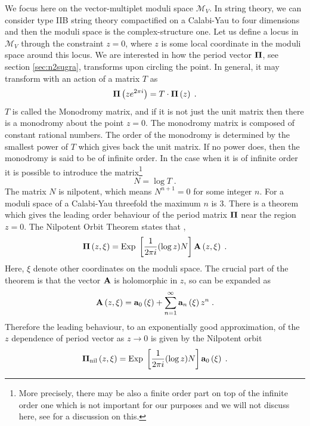 \documentclass[11pt,a4paper]{article}
\numberwithin{equation}{section}
\numberwithin{table}{section}\setlength{\multlinegap}{25pt}
\newcommand{\cM}{\mathcal M}
\newcommand{\be}{\begin{equation}}
\newcommand{\ee}{\end{equation}}
\begin{document}
We focus here on the vector-multiplet moduli space $\cM_V$. In string theory, we can consider type IIB string theory compactified on a Calabi-Yau to four dimensions and then the moduli space is the complex-structure one. Let us define a locus in $\cM_V$ through the constraint $z=0$, where $z$ is some local coordinate in the moduli space around this locus. We are interested in how the period vector ${\bf \Pi}$, see section \ref{sec:n2sugra}, transforms upon circling the point. In general, it may transform with an action of a matrix $T$ as
\be
{\bf \Pi}\left(z e^{2 \pi i}\right) = T \cdot {\bf \Pi}\left(z \right) \;.
\label{monTdef}
\ee
$T$ is called the Monodromy matrix, and if it is not just the unit matrix then there is a monodromy about the point $z=0$. The monodromy matrix is composed of constant rational numbers. The order of the monodromy is determined by the smallest power of $T$ which gives back the unit matrix. If no power does, then the monodromy is said to be of infinite order.  In the case when it is of infinite order it is possible to introduce the matrix\footnote{More precisely, there may be also a finite order part on top of the infinite order one which is not important for our purposes and we will not discuss here, see \cite{Grimm:2018ohb} for a discussion on this.} 
\be
N = \log T \;.
\ee
The matrix $N$ is nilpotent, which means $N^{n+1}=0$ for some integer $n$. For a moduli space of a Calabi-Yau threefold the maximum $n$ is 3. There is a theorem which gives the leading order behaviour of the period matrix ${\bf \Pi}$ near the region $z=0$. The Nilpotent Orbit Theorem states that \cite{Schmid}, 
\be
{\bf \Pi}\left(z,\xi\right) = \mathrm{Exp\;}\left[ \frac{1}{2\pi i} (\log z) N \right] {\bf A}\left(z,\xi \right) \;.
\label{nilorbgen}
\ee
Here, $\xi$ denote other coordinates on the moduli space. The crucial part of the theorem is that the vector ${\bf A}$ is holomorphic in $z$, so can be expanded as
\be
 {\bf A}\left(z,\xi \right) = {\bf a}_0\left(\xi\right) + \sum_{n=1}^{\infty} {\bf a}_n \left( \xi \right) z^n \;.
\ee
Therefore the leading behaviour, to an exponentially good approximation, of the $z$ dependence of period vector as $z \rightarrow 0$ is given by the Nilpotent orbit
\be
{\bf \Pi}_{\mathrm{nil}}\left(z,\xi\right) = \mathrm{Exp\;}\left[ \frac{1}{2\pi i} (\log z) N \right] {\bf a}_0\left(\xi \right) \;.
\label{nilorb}
\ee
\end{document}
